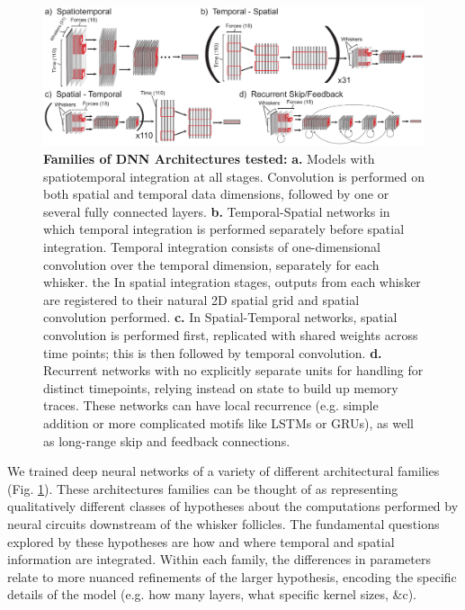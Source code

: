 \begin{figure}
\centering
\includegraphics [width=1\linewidth]{figures/architectures.pdf}
\vspace{-2mm}
\caption{\textbf{Families of DNN Architectures tested:} \textbf{a.} Models with spatiotemporal integration at all stages. Convolution is performed on both spatial and temporal data dimensions, followed by one or several fully connected layers. \textbf{b.} Temporal-Spatial networks in which temporal integration is performed separately before spatial integration.  Temporal integration consists of one-dimensional convolution over the temporal dimension, separately for each whisker. the In spatial integration stages, outputs from each whisker are registered to their natural 2D spatial grid and spatial convolution performed.  \textbf{c.} In Spatial-Temporal networks, spatial convolution is performed first, replicated with shared weights across time points; this is then followed by temporal convolution. \textbf{d.} Recurrent networks with no explicitly separate units for handling for distinct timepoints, relying instead on state to build up memory traces.  These networks can have local recurrence (e.g. simple addition or more complicated motifs like LSTMs or GRUs), as well as long-range skip and feedback connections.~\label{fig_archi}}
\end{figure}

We trained deep neural networks of a variety of different architectural families (Fig. \ref{fig_archi}).  
These architectures families can be thought of as representing qualitatively different classes of hypotheses about the computations performed by neural circuits downstream of the whisker follicles. 
The fundamental questions explored by these hypotheses are how and where temporal and spatial information are integrated.
Within each family, the differences in parameters relate to more nuanced refinements of the larger hypothesis, encoding the specific details of the model (e.g. how many layers, what specific kernel sizes, \&c). 
 
